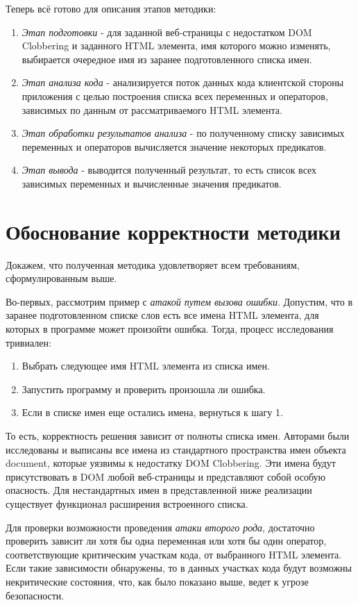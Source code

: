 Теперь всё готово для описания этапов методики:
\begin{enumerate}
	\item \textit{Этап подготовки} - для заданной веб-страницы с недостатком DOM Clobbering и заданного HTML элемента, имя которого можно изменять, выбирается очередное имя из заранее подготовленного списка имен.
	\item \textit{Этап анализа кода} - анализируется поток данных кода клиентской стороны приложения с целью построения списка всех переменных и операторов, зависимых по данным от рассматриваемого HTML элемента.
	\item \textit{Этап обработки результатов анализа} - по полученному списку зависимых переменных и операторов вычисляется значение некоторых предикатов.
	\item \textit{Этап вывода} - выводится полученный результат, то есть список всех зависимых переменных и вычисленные значения предикатов.
\end{enumerate}
\bigskip

\section{Обоснование корректности методики}
Докажем, что полученная методика удовлетворяет всем требованиям, сформулированным выше.


Во-первых, рассмотрим пример с \textit{атакой путем вызова ошибки}. Допустим, что в заранее подготовленном списке слов есть все имена HTML элемента, для которых в программе может произойти ошибка. Тогда, процесс исследования тривиален: 
\begin{enumerate}
	\item Выбрать следующее имя HTML элемента из списка имен.
	\item Запустить программу и проверить произошла ли ошибка.
	\item Если в списке имен еще остались имена, вернуться к шагу 1.
\end{enumerate}
То есть, корректность решения зависит от полноты списка имен. Авторами были исследованы и выписаны все имена из стандартного пространства имен объекта document, которые уязвимы к недостатку DOM Clobbering. Эти имена будут присутствовать в DOM любой веб-страницы и представляют собой особую опасность. Для нестандартных имен в представленной ниже реализации существует функционал расширения встроенного списка.

\bigskip
Для проверки возможности проведения \textit{атаки второго рода}, достаточно проверить зависит ли хотя бы одна переменная или хотя бы один оператор, соответствующие критическим участкам кода, от выбранного HTML элемента. Если такие зависимости обнаружены, то в данных участках кода будут возможны некритические состояния, что, как было показано выше, ведет к угрозе безопасности.

